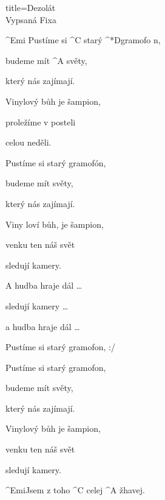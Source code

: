 \begin{song}{title=\predtitle\centering Dezolát\\\large Vypsaná Fixa \vspace*{-0.3cm}}
\begin{centerjustified}
\begin{varwidth}[t]{0.48\textwidth}
	\mezera

	^{Emi \z}Pustíme si ^{C \z}starý ^*{\z D}gramofo n,
	
	budeme mít ^{A \z}světy, 
	
	který nás zajímají.
	
	Vinylový bůh je šampion,
	
	proležíme v posteli 
	
	celou neděli.
	
	Pustíme si starý gramofón,
	
	budeme mít světy,
	
	který nás zajímají.
	
	Viny loví bůh, je šampion,
	
	venku ten náš svět 
	
	sledují kamery.
	
	\phantom{h}
	
	A hudba hraje dál \elipsa\dots

	sledují kamery \elipsa\dots

	a hudba hraje dál \elipsa\dots

	\phantom{h}	
	
	\ssloka{/:} Pustíme si starý gramofon, :/

	Pustíme si starý gramofon,
	
	budeme mít světy, 
	
	který nás zajímají.
	
	Vinylový bůh je šampion,
	
	venku ten náš svět 
	
	sledují kamery.
	
	\phantom{j}
	
	^{Emi}Jsem z toho ^{C \z}celej ^{A \z}žhavej.
	
	\mezera

	\centering

	\centering

\end{varwidth}

\end{centerjustified}
\setcounter{Slokočet}{0}
\end{song}
